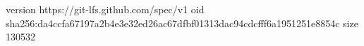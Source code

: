 version https://git-lfs.github.com/spec/v1
oid sha256:da4ccfa67197a2b4e3e32ed26ac67dfbf01313dac94cdcfff6a1951251e8854c
size 130532

